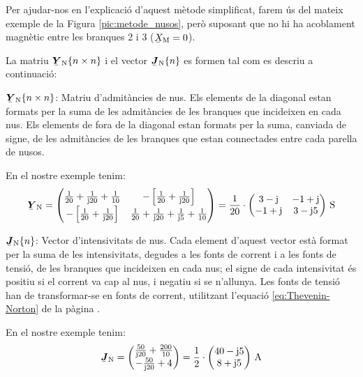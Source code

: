 Per ajudar-nos en l'explicaci\'{o} d'aquest m\`{e}tode simplificat, farem \'{u}s
del mateix exemple de la Figura \vref{pic:metode_nusos}, per\`{o}
suposant que no hi ha acoblament magn\`{e}tic entre les branques 2 i 3
($\cmplx{X}\ped{M}=0$).

La matriu $\mcmplx{Y}\ped{N}\{n \times n\}$ i el vector $\mcmplx{J}\ped{N}\{n\}$ es formen tal com es descriu a continuaci\'{o}:

\begin{list}{}
   {\setlength{\labelwidth}{20mm} \setlength{\leftmargin}{22mm} \setlength{\labelsep}{2mm}}

   \item[$\mcmplx{Y}\ped{N}\{n \times n\}$:] Matriu d'admit\`{a}ncies de nus. Els elements de la diagonal estan formats per la suma de les admit\`{a}ncies de les branques que incideixen en cada nus.
   Els elements de fora de la diagonal estan formats per la suma, canviada de signe, de les admit\`{a}ncies de les branques que estan connectades entre cada parella de nusos.

   En el nostre exemple tenim:
   \[
      \mcmplx{Y}\ped{N} =
      \begin{pmatrix}
            \frac{1}{20} + \frac{1}{\ju 20} +  \frac{1}{10} &
            -\left[\frac{1}{20} + \frac{1}{\ju 20}\right] \\
            -\left[\frac{1}{20} + \frac{1}{\ju 20}\right]  &
            \frac{1}{20} + \frac{1}{\ju 20} +  \frac{1}{\ju 5} + \frac{1}{10}
      \end{pmatrix} =
      \frac{1}{20} \cdot \begin{pmatrix}
            3 - \ju  & -1 + \ju \\ -1 + \ju & 3 - \ju 5
      \end{pmatrix}\unit{S}
   \]

   \item[$\mcmplx{J}\ped{N}\{n\}$:] Vector d'intensivitats de nus. Cada element d'aquest vector est\`{a} format per la suma de les intensivitats, degudes a les fonts de corrent i a les fonts de tensi\'{o}, de les branques que incideixen en cada nus; el signe de cada intensivitat \'{e}s positiu si el corrent va cap al nus, i negatiu si se n'allunya. Les fonts de tensi\'{o} han de transformar-se en fonts de corrent, utilitzant l'equaci\'{o} \eqref{eq:Thevenin-Norton} de la p\`{a}gina \pageref{eq:Thevenin-Norton}.

   En el nostre exemple tenim:
   \[
      \mcmplx{J}\ped{N} =
      \begin{pmatrix}
            \frac{50}{\ju 20} +  \frac{200}{10} \\
            - \frac{50}{\ju 20} + 4
      \end{pmatrix} =
      \frac{1}{2} \cdot \begin{pmatrix}
            40 - \ju 5 \\
            8 + \ju 5
      \end{pmatrix}\unit{A}
   \]

\end{list}

